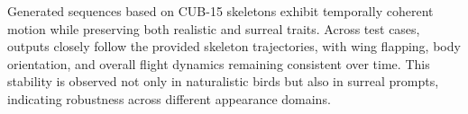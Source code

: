 \documentclass[final-report]{report-template}
\begin{document}





Generated sequences based on CUB-15 skeletons exhibit temporally coherent motion while preserving both realistic and surreal traits. 
Across test cases, outputs closely follow the provided skeleton trajectories, with wing flapping, body orientation, and overall flight dynamics remaining consistent over time. 
This stability is observed not only in naturalistic birds but also in surreal prompts, indicating robustness across different appearance domains.  
\end{document}
